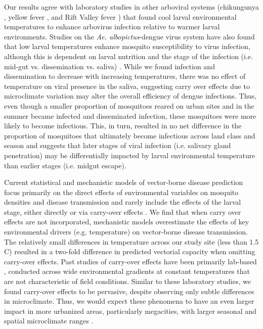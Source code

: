 \documentclass[12pt]{article}
\begin{document}
Our results agree with laboratory studies in other arboviral systems (chikungunya \citep{adelman2013}, yellow fever \citep{adelman2013}, and Rift Valley fever \citep{turell1993}) that found cool larval environmental temperatures to enhance arbovirus infection relative to warmer larval environments. Studies on the \textit{Ae. albopictus}-dengue virus system have also found that low larval temperatures enhance mosquito susceptibility to virus infection, although this is dependent on larval nutrition \citep{buckner2016} and the stage of the infection (i.e. mid-gut vs. dissemination vs. saliva) \citep{alto2013}. While we found infection and dissemination to decrease with increasing temperatures, there was no effect of temperature on viral presence in the saliva, suggesting carry over effects due to microclimate variation may alter the overall efficiency of dengue infections. Thus, even though a smaller proportion of mosquitoes reared on urban sites and in the summer became infected and disseminated infection, these mosquitoes were more likely to become infectious. This, in turn, resulted in no net difference in the proportion of mosquitoes that ultimately become infectious across land class and season and suggests that later stages of viral infection (i.e. salivary gland penetration) may be differentially impacted by larval environmental temperature than earlier stages (i.e. midgut escape).

Current statistical and mechanistic models of vector-borne disease prediction focus primarily on the direct effects of environmental variables on mosquito densities and disease transmission and rarely include the effects of the larval stage, either directly or via carry-over effects \citep{mordecai2017,ezeakacha2015}. We find that when carry over effects are not incorporated, mechanistic models overestimate the effects of key environmental drivers (e.g. temperature) on vector-borne disease transmission. The relatively small differences in temperature across our study site (less than 1.5 \degree C) resulted in a two-fold difference in predicted vectorial capacity when omitting carry-over effects. Past studies of carry-over effects have been primarily lab-based \citep{alto2008, alto2005}, conducted across wide environmental gradients at constant temperatures that are not characteristic of field conditions. Similar to these laboratory studies, we found carry-over effects to be pervasive, despite observing only subtle differences in microclimate. Thus, we would expect these phenomena to have an even larger impact in more urbanized areas, particularly megacities, with larger seasonal and spatial microclimate ranges \citep{peng2012}.
\end{document}
